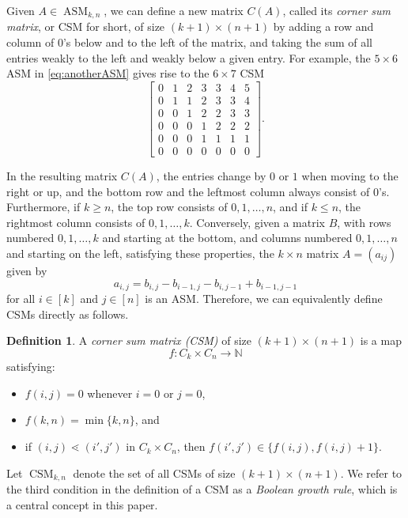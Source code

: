 \documentclass[12pt]{amsart}
\newcommand{\N}{{\mathbb N}}
\numberwithin{equation}{section}
\theoremstyle{definition}
\newtheorem{defin}[theorem]{Definition}
\newcommand{\longto}{\longrightarrow}
\newcommand{\ASM}{\operatorname{ASM}}
\newcommand{\CSM}{\operatorname{CSM}}
\begin{document}
Given $A \in \ASM_{k,n}$, we can define a new matrix $C(A)$, called its
\emph{corner sum matrix}, or CSM for short, of size $(k+1) \times
(n+1)$ by adding a row and column of $0$'s below and to the left of
the matrix, and taking the sum of all entries weakly to the left and
weakly below a given entry. For example, the $5 \times 6$ ASM in
\eqref{eq:anotherASM} gives rise to the $6 \times 7$ CSM
\begin{equation}\label{eq:anotherCSM}
\begin{bmatrix}
0 & 1 & 2 & 3 & 3 & 4 & 5 \\
0 & 1 & 1 & 2 & 3 & 3 & 4 \\
0 & 0 & 1  & 2 & 2 & 3 & 3 \\
0 & 0 & 0 & 1 & 2 & 2 & 2 \\
0 & 0 & 0 & 1 & 1 & 1 & 1 \\
0 & 0 & 0 & 0 & 0 & 0 & 0
\end{bmatrix}.
\end{equation}

In the resulting matrix $C(A)$, the entries change by $0$ or $1$ when
moving to the right or up, and the bottom row and the leftmost column
always consist of $0$'s. Furthermore, if $k \geq n$, the top row
consists of $0,1,\ldots,n$, and if $k \leq n$, the rightmost column
consists of $0,1,\ldots,k$. Conversely, given a matrix $B$, with rows
numbered $0,1,\ldots,k$ and starting at the bottom, and columns
numbered $0,1,\ldots,n$ and starting on the left, satisfying these
properties, the $k \times n$ matrix $A=(a_{ij})$ given by
\[
a_{i,j} =b_{i,j}-b_{i-1,j}-b_{i,j-1}+b_{i-1,j-1}
\]
for all $i\in [k]$ and $j\in [n]$ is an ASM.  Therefore, we can
equivalently define CSMs directly as follows.

\begin{defin}\label{def:CSM}
A \emph{corner sum matrix (CSM)} of size $(k+1) \times (n+1)$ is a map
$$f \colon C_k \times C_n \longto \N$$
satisfying:
\begin{itemize}
 \item $f(i,j) = 0$ whenever $i =0$ or $j = 0 $,
 \item $f(k,n) = \min\{k,n\}$, and
 \item if $(i,j) \lessdot (i',j')$ in $C_k \times C_n$, then $f(i',j') \in \{f(i,j),f(i,j)+1\}$.
\end{itemize}
Let $\CSM_{k,n}$ denote the set of all CSMs of size $(k+1) \times (n+1)$.  We
refer to the third condition in the definition of a CSM as a
\textit{Boolean growth rule}, which is a central concept in this
paper.
\end{defin}
\end{document}
